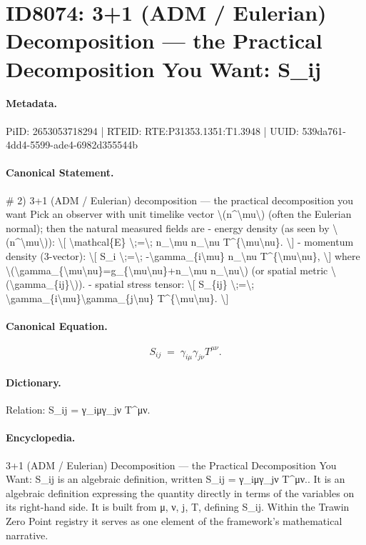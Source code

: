 \section*{ID8074: 3+1 (ADM / Eulerian) Decomposition — the Practical Decomposition You Want: S\_ij}
\paragraph{Metadata.}
PiID: 2653053718294 | RTEID: RTE:P31353.1351:T1.3948 | UUID: 539da761-4dd4-5599-ade4-6982d355544b

\paragraph{Canonical Statement.}
\# 2) 3+1 (ADM / Eulerian) decomposition — the practical decomposition you want Pick an observer with unit timelike vector \textbackslash{}(n\textasciicircum{}\textbackslash{}mu\textbackslash{}) (often the Eulerian normal); then the natural measured fields are - energy density (as seen by \textbackslash{}(n\textasciicircum{}\textbackslash{}mu\textbackslash{})): \textbackslash{}[ \textbackslash{}mathcal\{E\} \textbackslash{};=\textbackslash{}; n\_\textbackslash{}mu n\_\textbackslash{}nu T\textasciicircum{}\{\textbackslash{}mu\textbackslash{}nu\}. \textbackslash{}] - momentum density (3-vector): \textbackslash{}[ S\_i \textbackslash{};=\textbackslash{}; -\textbackslash{}gamma\_\{i\textbackslash{}mu\} n\_\textbackslash{}nu T\textasciicircum{}\{\textbackslash{}mu\textbackslash{}nu\}, \textbackslash{}] where \textbackslash{}(\textbackslash{}gamma\_\{\textbackslash{}mu\textbackslash{}nu\}=g\_\{\textbackslash{}mu\textbackslash{}nu\}+n\_\textbackslash{}mu n\_\textbackslash{}nu\textbackslash{}) (or spatial metric \textbackslash{}(\textbackslash{}gamma\_\{ij\}\textbackslash{})). - spatial stress tensor: \textbackslash{}[ S\_\{ij\} \textbackslash{};=\textbackslash{}; \textbackslash{}gamma\_\{i\textbackslash{}mu\}\textbackslash{}gamma\_\{j\textbackslash{}nu\} T\textasciicircum{}\{\textbackslash{}mu\textbackslash{}nu\}. \textbackslash{}]

\paragraph{Canonical Equation.}
\[
S_{ij} \;=\; \gamma_{i\mu}\gamma_{j\nu} T^{\mu\nu}.
\]

\paragraph{Dictionary.}
Relation: S\_ij = γ\_iμγ\_jν T\textasciicircum{}μν.

\paragraph{Encyclopedia.}
3+1 (ADM / Eulerian) Decomposition — the Practical Decomposition You Want: S\_ij is an algebraic definition, written S\_ij = γ\_iμγ\_jν T\textasciicircum{}μν.. It is an algebraic definition expressing the quantity directly in terms of the variables on its right-hand side. It is built from μ, ν, j, T, defining S\_ij. Within the Trawin Zero Point registry it serves as one element of the framework's mathematical narrative.
